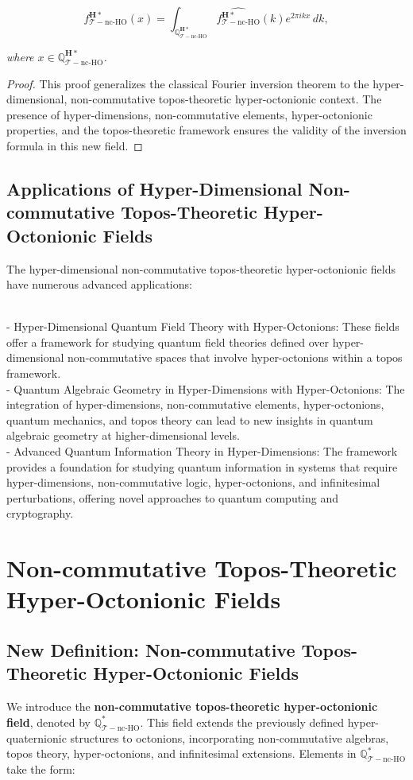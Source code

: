 \documentclass{article}
\begin{document}
\[
f_{\mathcal{T}-\text{nc-HO}}^{\mathbf{H}*}(x) = \int_{\mathbb{Q}_{\mathcal{T}-\text{nc-HO}}^{\mathbf{H}*}} \widehat{f_{\mathcal{T}-\text{nc-HO}}^{\mathbf{H}*}}(k) e^{2\pi i k x} \, dk,
\]

\textit{where \(x \in \mathbb{Q}_{\mathcal{T}-\text{nc-HO}}^{\mathbf{H}*}\).}

\begin{proof}
This proof generalizes the classical Fourier inversion theorem to the hyper-dimensional, non-commutative topos-theoretic hyper-octonionic context. The presence of hyper-dimensions, non-commutative elements, hyper-octonionic properties, and the topos-theoretic framework ensures the validity of the inversion formula in this new field.
\end{proof}

\subsection{Applications of Hyper-Dimensional Non-commutative Topos-Theoretic Hyper-Octonionic Fields}
The hyper-dimensional non-commutative topos-theoretic hyper-octonionic fields have numerous advanced applications:

{\ }\\
- Hyper-Dimensional Quantum Field Theory with Hyper-Octonions: These fields offer a framework for studying quantum field theories defined over hyper-dimensional non-commutative spaces that involve hyper-octonions within a topos framework.
{\ }\\
- Quantum Algebraic Geometry in Hyper-Dimensions with Hyper-Octonions: The integration of hyper-dimensions, non-commutative elements, hyper-octonions, quantum mechanics, and topos theory can lead to new insights in quantum algebraic geometry at higher-dimensional levels.
{\ }\\
- Advanced Quantum Information Theory in Hyper-Dimensions: The framework provides a foundation for studying quantum information in systems that require hyper-dimensions, non-commutative logic, hyper-octonions, and infinitesimal perturbations, offering novel approaches to quantum computing and cryptography.


\section{Non-commutative Topos-Theoretic Hyper-Octonionic Fields}
\subsection{New Definition: Non-commutative Topos-Theoretic Hyper-Octonionic Fields}
We introduce the \textbf{non-commutative topos-theoretic hyper-octonionic field}, denoted by \(\mathbb{Q}_{\mathcal{T}-\text{nc-HO}}^*\). This field extends the previously defined hyper-quaternionic structures to octonions, incorporating non-commutative algebras, topos theory, hyper-octonions, and infinitesimal extensions. Elements in \(\mathbb{Q}_{\mathcal{T}-\text{nc-HO}}^*\) take the form:
\end{document}
